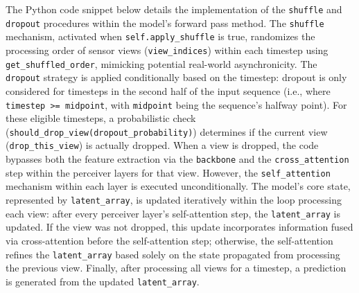 
The Python code snippet below details the implementation of the \texttt{shuffle} and \texttt{dropout} procedures within the model's forward pass method. The \texttt{shuffle} mechanism, activated when \texttt{self.apply\_shuffle} is true, randomizes the processing order of sensor views (\texttt{view\_indices}) within each timestep using \texttt{get\_shuffled\_order}, mimicking potential real-world asynchronicity. The \texttt{dropout} strategy is applied conditionally based on the timestep: dropout is only considered for timesteps in the second half of the input sequence (i.e., where \texttt{timestep >= midpoint}, with \texttt{midpoint} being the sequence's halfway point). For these eligible timesteps, a probabilistic check (\texttt{should\_drop\_view(dropout\_probability)}) determines if the current view (\texttt{drop\_this\_view}) is actually dropped. When a view is dropped, the code bypasses both the feature extraction via the \texttt{backbone} and the \texttt{cross\_attention} step within the perceiver layers for that view. However, the \texttt{self\_attention} mechanism within each layer is executed unconditionally. The model's core state, represented by \texttt{latent\_array}, is updated iteratively within the loop processing each view: after every perceiver layer's self-attention step, the \texttt{latent\_array} is updated. If the view was not dropped, this update incorporates information fused via cross-attention before the self-attention step; otherwise, the self-attention refines the \texttt{latent\_array} based solely on the state propagated from processing the previous view. Finally, after processing all views for a timestep, a prediction is generated from the updated \texttt{latent\_array}.


